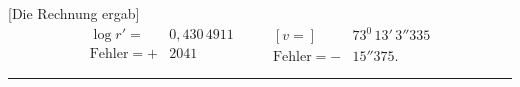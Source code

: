 \clearpage
{}
\begin{center}\end{center}
\noindent{\small [S. 6]}\par
\noindent\hspace*{\parindent}[Die Rechnung ergab]
\[
\begin{array}{rl}
\log r'=&0{,}430\,4911\\
\text{Fehler}=+&2041
\end{array}
\qquad
\begin{array}{rl}
{}[v=]&73^0\,13'\,3''335\\
\text{Fehler}=-&15''375.
\end{array}
\]
\noindent\rule{\linewidth}{.3pt}
\clearpage
\endgroup
